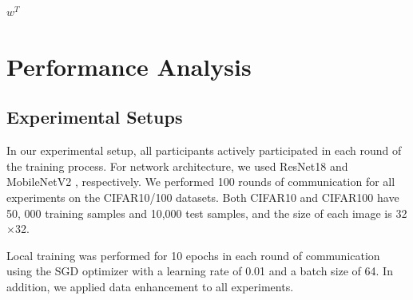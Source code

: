 \documentclass[journal,twoside,web]{ieeecolor}
\begin{document}
\begin{algorithm}[h]
\SetAlgoLined
\caption{FCPC (Proposed Framework)}
\label{alg:FCPC}

\Return $w^T$
\end{algorithm}




\section{Performance Analysis}

\subsection{Experimental Setups}
In our experimental setup, all participants actively participated in each round of the training process. For network architecture, we used ResNet18\cite{resnet} and MobileNetV2 \cite{mobilenetv2}, respectively. We performed 100 rounds of communication for all experiments on the CIFAR10/100\cite{cifar10} datasets. Both CIFAR10 and CIFAR100 have 50, 000 training samples and 10,000 test samples, and the size of each image is 32$\times$32. 

Local training was performed for 10 epochs in each round of communication using the SGD optimizer with a learning rate of 0.01 and a batch size of 64. In addition, we applied data enhancement to all experiments.




\end{document}
